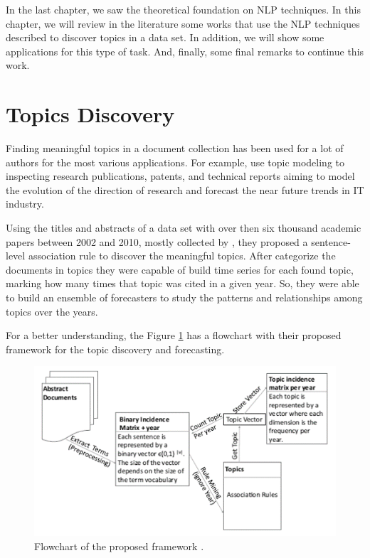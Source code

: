 In the last chapter, we saw the theoretical foundation on NLP techniques. In this chapter, we will review in the literature some works that use the NLP techniques described to discover topics in a data set. In addition, we will show some applications for this type of task. And, finally, some final remarks to continue this work.


\section{Topics Discovery}

Finding meaningful topics in a document collection has been used for a lot of authors for the most various applications. For example, \cite{hurtado2016topic} use topic modeling to inspecting research publications, patents, and technical reports aiming to model the evolution of the direction of research and forecast the near future trends in IT industry.

Using the titles and abstracts of a data set with over then six thousand academic papers between 2002 and 2010, mostly collected by , they proposed a sentence-level association rule to discover the meaningful topics. After categorize the documents in topics they were capable of build time series for each found topic, marking how many times that topic was cited in a given year. So, they were able to build an ensemble of forecasters to study the patterns and relationships among topics over the years.

For a better understanding, the Figure \ref{fig:topic-discovery-framework} has a flowchart with their proposed framework for the topic discovery and forecasting.

\begin{figure}[h!]
	\centering
	\includegraphics[width=0.6\linewidth]{01.Chapters/03.RelatedWorks/topic-discovery-framework}
	\caption{Flowchart of the proposed framework \cite{hurtado2016topic}.}
	\label{fig:topic-discovery-framework}
\end{figure}

